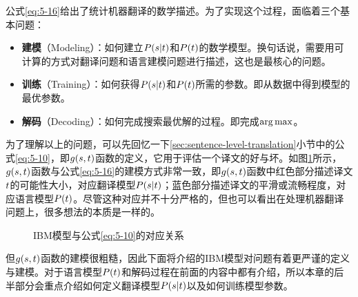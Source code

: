 \parinterval 公式\eqref{eq:5-16}给出了统计机器翻译的数学描述。为了实现这个过程，面临着三个基本问题：

\begin{itemize}
\vspace{0.5em}
\item {\small\sffamily\bfseries{建模}}（Modeling）：如何建立${P}({s}|{t})$和${P}({t})$的数学模型。换句话说，需要用可计算的方式对翻译问题和语言建模问题进行描述，这也是最核心的问题。
\vspace{0.5em}
\item {\small\sffamily\bfseries{训练}}（Training）：如何获得${P}({s}|{t})$和${P}({t})$所需的参数。即从数据中得到模型的最优参数。
\vspace{0.5em}
\item {\small\sffamily\bfseries{解码}}（Decoding）：如何完成搜索最优解的过程。即完成$\operatorname*{arg\,max}$。
\vspace{0.5em}
\end{itemize}

\parinterval 为了理解以上的问题，可以先回忆一下\ref{sec:sentence-level-translation}小节中的公式\eqref{eq:5-10}，即$g({s},{t})$函数的定义，它用于评估一个译文的好与坏。如图\ref{fig:5-14}所示，$g({s},{t})$函数与公式\eqref{eq:5-16}的建模方式非常一致，即$g({s},{t})$函数中红色部分描述译文${t}$的可能性大小，对应翻译模型${P}({s}|{t})$；蓝色部分描述译文的平滑或流畅程度，对应语言模型${P}({t})$。尽管这种对应并不十分严格的，但也可以看出在处理机器翻译问题上，很多想法的本质是一样的。

\begin{figure}[htp]
    \centering

    \caption{IBM模型与公式\eqref{eq:5-10}的对应关系}
    \label{fig:5-14}
\end{figure}

\parinterval 但$g({s},{t})$函数的建模很粗糙，因此下面将介绍的IBM模型对问题有着更严谨的定义与建模。对于语言模型${P}({t})$和解码过程在前面的内容中都有介绍，所以本章的后半部分会重点介绍如何定义翻译模型${P}({s}|{t})$以及如何训练模型参数。


